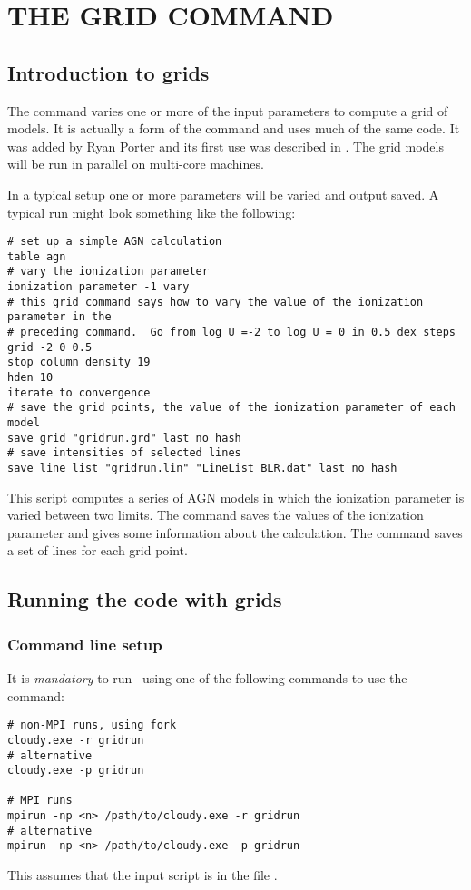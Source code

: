 \chapter{THE GRID COMMAND}
\label{sec:CommandGrid}

\section{Introduction to grids}

The  command varies one or more of the input parameters
to compute a grid of models.
It is actually a form of the  command and uses much
of the same code.
It was added by Ryan Porter and its first use was
described in \citet{Porter2006}.
The grid models will be run in parallel on multi-core machines.

In a typical setup one or more parameters will be varied and output saved.
A typical  run might look something like the following:
\begin{verbatim}
# set up a simple AGN calculation
table agn
# vary the ionization parameter
ionization parameter -1 vary
# this grid command says how to vary the value of the ionization parameter in the
# preceding command.  Go from log U =-2 to log U = 0 in 0.5 dex steps
grid -2 0 0.5
stop column density 19
hden 10
iterate to convergence
# save the grid points, the value of the ionization parameter of each model
save grid "gridrun.grd" last no hash
# save intensities of selected lines
save line list "gridrun.lin" "LineList_BLR.dat" last no hash
\end{verbatim}

This script computes a series of AGN models in which the ionization parameter
is varied between two limits.
The  command saves the values of the ionization parameter
and gives some information about the calculation.
The  command saves a set of lines for each grid point.

\section{Running the code with grids}

\subsection{Command line setup}
It is {\em mandatory} to run \Cloudy\ using one of the
following commands to use the  command:
%
\begin{verbatim}
# non-MPI runs, using fork
cloudy.exe -r gridrun
# alternative
cloudy.exe -p gridrun

# MPI runs
mpirun -np <n> /path/to/cloudy.exe -r gridrun
# alternative
mpirun -np <n> /path/to/cloudy.exe -p gridrun
\end{verbatim}
This assumes that the input script is in the file . 

